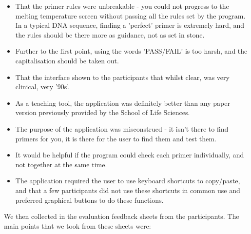 \begin{itemize}

\item That the primer rules were unbreakable - you could not progress to the melting temperature screen without passing all the rules set by the program. In a typical DNA sequence, finding a 'perfect' primer is extremely hard, and the rules should be there more as guidance, not as set in stone.
\item Further to the first point, using the words 'PASS/FAIL' is too harsh, and the capitalisation should be taken out.
\item That the interface shown to the participants that whilst clear, was very clinical, very '90s'.
\item As a teaching tool, the application was definitely better than any paper version previously provided by the School of Life Sciences.
\item The purpose of the application was misconstrued - it isn't there to find primers for you, it is there for the user to find them and test them.
\item It would be helpful if the program could check each primer individually, and not together at the same time.
\item The application required the user to use keyboard shortcuts to copy/paste, and that a few participants did not use these shortcuts in common use and preferred graphical buttons to do these functions.
\end{itemize}

We then collected in the evaluation feedback sheets from the participants. The main points that we took from these sheets were:

